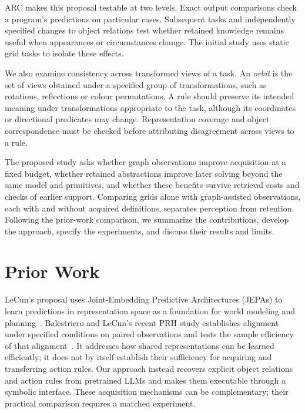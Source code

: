 \documentclass[11pt]{article}
\begin{document}
ARC makes this proposal testable at two levels. Exact output comparisons check a program's predictions on particular cases. Subsequent tasks and independently specified changes to object relations test whether retained knowledge remains useful when appearances or circumstances change. The initial study uses static grid tasks to isolate these effects.

We also examine consistency across transformed views of a task. An \emph{orbit} is the set of views obtained under a specified group of transformations, such as rotations, reflections or colour permutations. A rule should preserve its intended meaning under transformations appropriate to the task, although its coordinates or directional predicates may change. Representation coverage and object correspondence must be checked before attributing disagreement across views to a rule.

The proposed study asks whether graph observations improve acquisition at a fixed budget, whether retained abstractions improve later solving beyond the same model and primitives, and whether these benefits survive retrieval costs and checks of earlier support. Comparing grids alone with graph-assisted observations, each with and without acquired definitions, separates perception from retention. Following the prior-work comparison, we summarize the contributions, develop the approach, specify the experiments, and discuss their results and limits.

\section{Prior Work}\label{sec:prior-work}
LeCun's proposal uses Joint-Embedding Predictive Architectures (JEPAs) to learn predictions in representation space as a foundation for world modeling and planning~\cite{lecun2022}. Balestriero and LeCun's recent PRH study establishes alignment under specified conditions on paired observations and tests the sample efficiency of that alignment~\cite{jepa}. It addresses how shared representations can be learned efficiently; it does not by itself establish their sufficiency for acquiring and transferring action rules. Our approach instead recovers explicit object relations and action rules from pretrained LLMs and makes them executable through a symbolic interface. These acquisition mechanisms can be complementary; their practical comparison requires a matched experiment.
\end{document}
